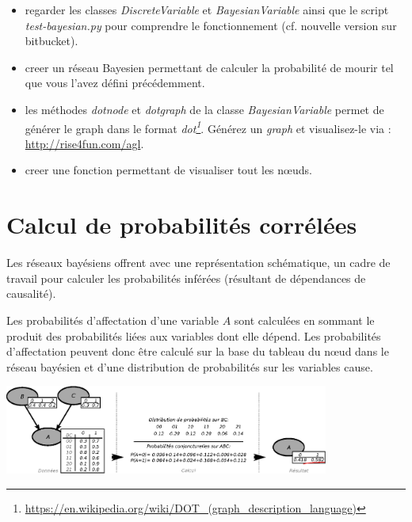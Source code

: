 \documentclass[a4paper, 10pt]{article}
\begin{document}
  \begin{itemize}[$\bigcirc$]
    \item regarder les classes \emph{DiscreteVariable} et \emph{BayesianVariable} ainsi que le script \emph{test-bayesian.py} pour comprendre le fonctionnement (cf. nouvelle version sur bitbucket).
    \item creer un réseau Bayesien permettant de calculer la probabilité de mourir tel que vous l'avez défini précédemment.
    \item les méthodes \emph{dotnode} et \emph{dotgraph} de la classe \emph{BayesianVariable} permet de générer le graph dans le format \emph{dot\footnote{\url{https://en.wikipedia.org/wiki/DOT\_(graph\_description\_language)}}}. Générez un \emph{graph} et visualisez-le via : \url{http://rise4fun.com/agl}.
    \item creer une fonction permettant de visualiser tout les n\oe{}uds.
  \end{itemize}

\section{Calcul de probabilités corrélées}

  Les réseaux bayésiens offrent avec une représentation schématique, un cadre de travail pour calculer les probabilités inférées (résultant de dépendances de causalité).

  Les probabilités d'affectation d'une variable $A$ sont calculées en sommant le produit des probabilités liées aux variables dont elle dépend.
  Les probabilités d'affectation peuvent donc être calculé sur la base du tableau du n\oe{}ud dans le réseau bayésien et d'une distribution de probabilités sur les variables cause.

  \begin{center}
    \includegraphics[width=0.8\textwidth]{fig/resbay_calcul}
  \end{center}
\end{document}
